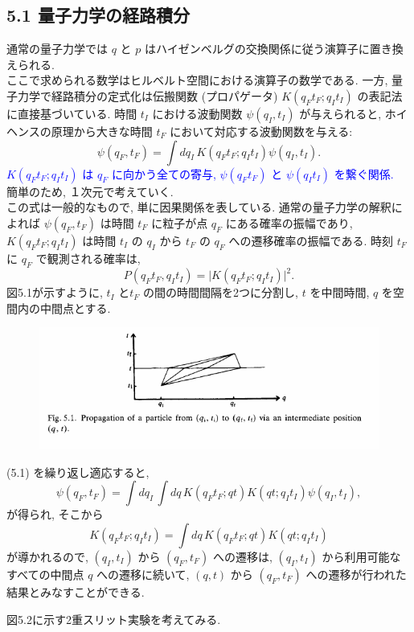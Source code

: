 \documentclass[a4paper,12pt]{article}
\begin{document}
\subsection*{\textrm{5.1 量子力学の経路積分}}
通常の量子力学では $q$ と $p$ はハイゼンベルグの交換関係に従う演算子に置き換えられる.\\
ここで求められる数学はヒルベルト空間における演算子の数学である. 一方, 量子力学で経路積分の定式化は伝搬関数 (プロパゲータ) $K(q_{F}t_{F}; q_{I}t_{I})$ の表記法に直接基づいている. 時間 $t_{I}$ における波動関数 $\psi(q_I, t_I)$ が与えられると, ホイヘンスの原理から大きな時間 $t_F$ において対応する波動関数を与える:
\begin{equation*}
    \psi(q_F, t_F) = \int dq_I\, K(q_{F}t_{F}; q_{I}t_{I})\psi(q_I, t_I). \tag{5.1}
\end{equation*}
\textcolor{blue}{$K(q_{F}t_{F}; q_{I}t_{I})$ は $q_{F}$ に向かう全ての寄与, $\psi(q_{F}t_{F})$ と $\psi(q_{I}t_{I})$ を繋ぐ関係.}\\
簡単のため, １次元で考えていく.\\
この式は一般的なもので, 単に因果関係を表している. 通常の量子力学の解釈によれば $\psi(q_F, t_F)$ は時間 $t_F$ に粒子が点 $q_F$ にある確率の振幅であり, $K(q_{F}t_{F}; q_{I}t_{I})$ は時間 $t_I$ の $q_I$ から $t_F$ の $q_F$ への遷移確率の振幅である.
時刻 $t_F$ に $q_F$ で観測される確率は,
\begin{equation*}
    P(q_{F}t_{F}, q_{I}t_{I}) = \lvert K(q_{F}t_{F}; q_{I}t_{I}) \rvert^2.
\end{equation*}
図5.1が示すように, $t_I$ と$t_F$ の間の時間間隔を2つに分割し, $t$ を中間時間, $q$ を空間内の中間点とする.

\begin{figure}[H]
    \centering
    \includegraphics[width=15cm]{figure/fig5-1.png}
\end{figure}

(5.1) を繰り返し適応すると,
\begin{equation*}
    \psi(q_F, t_F) = \int dq_I\, \int dq\, K(q_{F}t_{F}; qt)K(qt; q_{I}t_{I})\psi(q_I, t_I),
\end{equation*}
が得られ, そこから
\begin{equation*}
    K(q_{F}t_{F}; q_{I}t_{I}) = \int dq\, K(q_{F}t_{F}; qt)K(qt; q_{I}t_{I}) \tag{5.2}
\end{equation*}
が導かれるので, $(q_I, t_I)$ から $(q_F, t_F)$ への遷移は, $(q_I, t_I)$ から利用可能なすべての中間点 $q$ への遷移に続いて, $(q, t)$ から $(q_F, t_F)$ への遷移が行われた結果とみなすことができる.\par
図5.2に示す2重スリット実験を考えてみる. 
\end{document}
